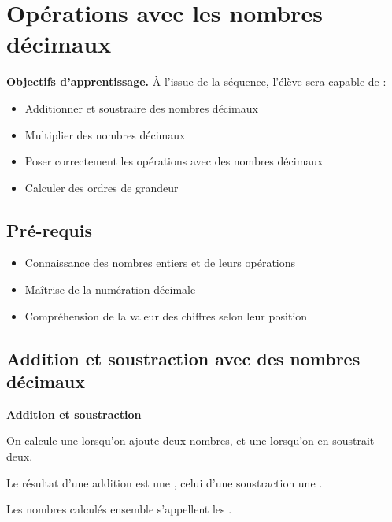 \chapter{Opérations avec les nombres décimaux}
\label{chap:seq08}

\begin{objectifsbox}
\textbf{Objectifs d'apprentissage.} À l'issue de la séquence, l'élève sera capable de :
\begin{itemize}
  \item Additionner et soustraire des nombres décimaux
  \item Multiplier des nombres décimaux
  \item Poser correctement les opérations avec des nombres décimaux
  \item Calculer des ordres de grandeur
\end{itemize}
\end{objectifsbox}

\section*{Pré-requis}
\begin{itemize}
  \item Connaissance des nombres entiers et de leurs opérations
  \item Maîtrise de la numération décimale
  \item Compréhension de la valeur des chiffres selon leur position
\end{itemize}

\section{Addition et soustraction avec des nombres décimaux}

\begin{definitionbox}
	\textbf{Addition et soustraction}
	
	On calcule une \textbf{\trous{3cm}} lorsqu'on ajoute deux nombres, et une \textbf{\trous{3cm}} lorsqu'on en soustrait deux.
	
	Le résultat d'une addition est une \textbf{\trous{2.5cm}}, celui d'une soustraction une \textbf{\trous{2.5cm}}.
	
	Les nombres calculés ensemble s'appellent les \textbf{\trous{2.5cm}}.
\end{definitionbox}


